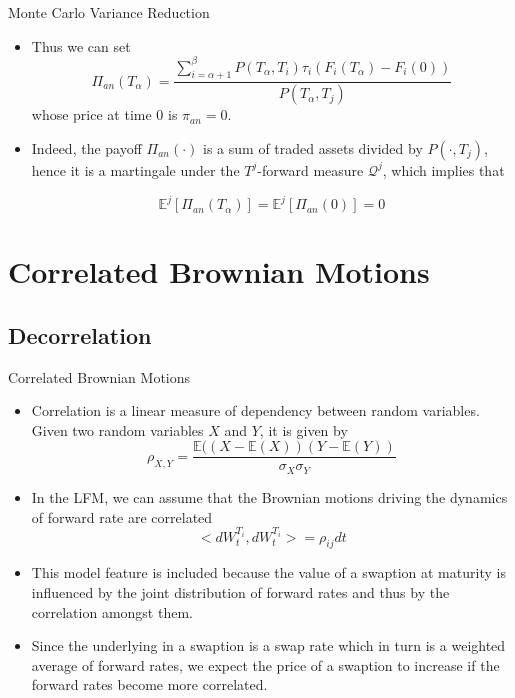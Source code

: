 \documentclass{beamer}
\begin{document}
\begin{frame}{Monte Carlo Variance Reduction}
  \begin{itemize}
  \item<1-> Thus we can set
    \begin{equation*}
      \Pi_{an}(T_\alpha) = \frac{\sum_{i=\alpha+1}^\beta P(T_\alpha,T_i)\tau_i(F_i(T_\alpha) - F_i(0))}{P(T_\alpha,T_j)}
    \end{equation*}
    whose price at time 0 is $\pi_{an} = 0$.
  \item<2-> Indeed, the payoff $\Pi_{an}(\cdot)$ is a sum of traded assets divided by $P(\cdot, T_j)$, hence it is a martingale under the $T^j$-forward measure $\mathcal{Q}^j$, which implies that
    
    \begin{equation*}
      \mathbb{E}^j[\Pi_{an}(T_\alpha)] = \mathbb{E}^j[\Pi_{an}(0)] = 0
    \end{equation*}
  \end{itemize}
\end{frame}

\section{Correlated Brownian Motions}
\subsection{Decorrelation}
\begin{frame}{Correlated Brownian Motions}
  \begin{itemize}
  \item<1-> Correlation is a linear measure of dependency between random variables. Given two random variables $X$ and $Y$, it is given by
  	\begin{equation*}
  		\rho_{X,Y} = \frac{\mathbb{E}((X-\mathbb{E}(X))(Y-\mathbb{E}(Y))}{\sigma_X \sigma_Y}
  	\end{equation*}
  \item<2-> In the LFM, we can assume that the Brownian motions driving the dynamics of forward rate are correlated
    \begin{equation}
      <dW_t^{T_i}, dW_t^{T_i}> = \rho_{ij}dt
    \end{equation}
  \item<3-> This model feature is included because the value of a swaption at maturity is influenced by the joint distribution of forward rates and thus by the correlation amongst them. 
  \item<4-> Since the underlying in a swaption is a swap rate which in turn is a weighted average of forward rates, we expect the price of a swaption to increase if the forward rates become more correlated. 
  \end{itemize}
\end{frame}
\end{document}
